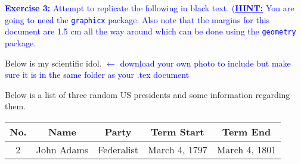 \documentclass[]{article}
\newcommand{\BlueText}[1]{\textcolor{blue}{#1}}
\begin{document}
\noindent \BlueText{\textbf{Exercise 3:} Attempt to replicate the following in black text.
(\textbf{\underline{HINT:}} You are going to need the \texttt{graphicx} package. Also note that the margins for this document are 1.5 cm all the way around which can be done using the \texttt{geometry} package.}
\vspace{1cm}

\noindent Below is my scientific idol. \BlueText{$\leftarrow$ download your own photo to include but make sure it is in the same folder as your .tex document}

\begin{figure}[h]

\end{figure}

\noindent Below is a list of three random US presidents and some information regarding them.

\begin{table}[h]
\centering
\begin{tabular}{| c | c | c | c | c |}
	\hline
	\textbf{No.} & \textbf{Name} & \textbf{Party} & \textbf{Term Start} & \textbf{Term End} \\ \hline
	2 & John Adams & Federalist & March 4, 1797 & March 4, 1801 \\ \hline

	
\end{tabular}
\end{table}
\end{document}
